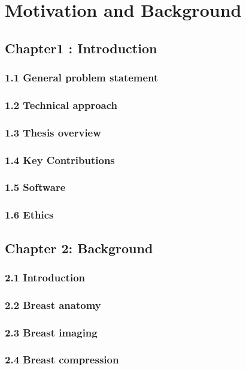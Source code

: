 \section*{Motivation and Background}
\subsection*{Chapter1 : Introduction}


\subsubsection*{1.1	General problem statement }
\subsubsection*{1.2	Technical approach }
\subsubsection*{1.3 Thesis overview}
\subsubsection*{1.4 Key Contributions }
\subsubsection*{1.5 Software }
\subsubsection*{1.6 Ethics }
\subsection*{Chapter 2: Background} 
\subsubsection*{2.1 Introduction} 
\subsubsection*{2.2 Breast anatomy}
\subsubsection*{2.3 Breast imaging} 
\subsubsection*{2.4 Breast compression}

